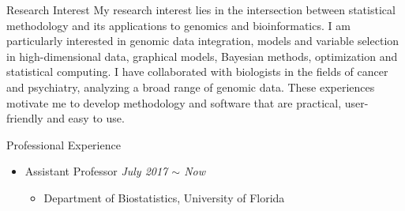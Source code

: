 \documentclass{resume} %
\begin{document}
\begin{rSection}{Research Interest}
My research interest lies in the intersection between statistical methodology and its applications to genomics and bioinformatics.	
I am particularly interested in genomic data integration, models and variable selection in high-dimensional data, graphical models, Bayesian methods, optimization and statistical computing. 
I have collaborated with biologists in the fields of cancer and psychiatry, analyzing a broad range of genomic data. 
These experiences motivate me to develop methodology and software that are practical, user-friendly and easy to use.
\end{rSection}

\begin{rSection}{Professional Experience}
\begin{itemize}[noitemsep,topsep=0pt]

\item Assistant Professor
        \hfill {\em July 2017 $\sim$ Now} 
        \begin{itemize}
        \item Department of Biostatistics, University of Florida
        \end{itemize}
\end{itemize}
\end{rSection}
\end{document}
